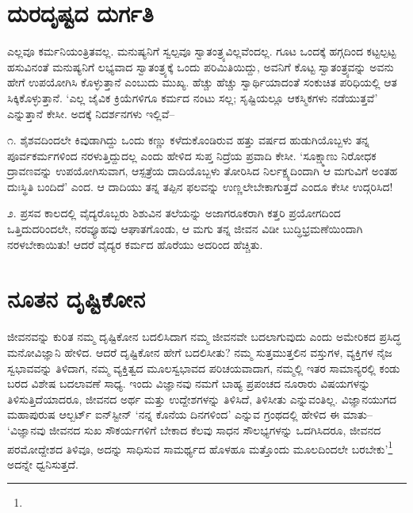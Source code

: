 \section*{ದುರದೃಷ್ಟದ ದುರ್ಗತಿ}


ಎಲ್ಲವೂ ಕರ್ಮನಿಯಂತ್ರಿತವಲ್ಲ. ಮನುಷ್ಯನಿಗೆ ಸ್ವಲ್ಪವೂ ಸ್ವಾತಂತ್ರ್ಯವಿಲ್ಲವೆಂದಲ್ಲ. ಗೂಟ ಒಂದಕ್ಕೆ ಹಗ್ಗದಿಂದ ಕಟ್ಟಲ್ಪಟ್ಟ ಹಸುವಿನಂತೆ ಮನುಷ್ಯನಿಗೆ ಲಭ್ಯವಾದ ಸ್ವಾತಂತ್ರ್ಯಕ್ಕೆ ಒಂದು ಪರಿಮಿತಿಯಿದ್ದು, ಅವನಿಗೆ ಕೊಟ್ಟ ಸ್ವಾತಂತ್ರ್ಯವನ್ನು ಅವನು ಹೇಗೆ ಉಪಯೋಗಿಸಿ ಕೊಳ್ಳುತ್ತಾನೆ ಎಂಬುದು ಮುಖ್ಯ. ಹೆಚ್ಚು ಹೆಚ್ಚು ಸ್ವಾರ್ಥಿಯಾದಂತೆ ಸಂಕುಚಿತ ಪರಿಧಿಯಲ್ಲಿ ಆತ ಸಿಕ್ಕಿಕೊಳ್ಳುತ್ತಾನೆ. ‘ಎಲ್ಲ ಜೈವಿಕ ಕ್ರಿಯೆಗಳಿಗೂ ಕರ್ಮದ ನಂಟು ಸಲ್ಲ; ಸೃಷ್ಟಿಯಲ್ಲೂ ಆಕಸ್ಮಿಕಗಳು ನಡೆಯುತ್ತವೆ’ ಎನ್ನುತ್ತಾನೆ ಕೇಸೀ. ಅದಕ್ಕೆ ನಿದರ್ಶನಗಳು ಇಲ್ಲಿವೆ–

೧. ಶೈಶವದಿಂದಲೇ ಕಿವುಡಾಗಿದ್ದು ಒಂದು ಕಣ್ಣು ಕಳೆದುಕೊಂಡಿರುವ ಹತ್ತು ವರ್ಷದ ಹುಡುಗಿಯೊಬ್ಬಳು ತನ್ನ ಪೂರ್ವಕರ್ಮಗಳಿಂದ ನರಳುತ್ತಿದ್ದುದಲ್ಲ ಎಂದು ಹೇಳಿದ ಸುಪ್ತ ನಿದ್ರೆಯ ಪ್ರವಾದಿ ಕೇಸೀ. ‘ಸೂಕ್ಷ್ಮಾಣು ನಿರೋಧಕ ದ್ರಾವಣವನ್ನು ಉಪಯೋಗಿಸುವಾಗ, ಆಸ್ಪತ್ರೆಯ ದಾದಿಯೊಬ್ಬಳು ತೋರಿಸಿದ ನಿರ್ಲಕ್ಷ್ಯದಿಂದಾಗಿ ಆ ಮಗುವಿಗೆ ಅಂತಹ ದುಃಸ್ಥಿತಿ ಬಂದಿದೆ’ ಎಂದ. ಆ ದಾದಿಯು ತನ್ನ ತಪ್ಪಿನ ಫಲವನ್ನು ಉಣ್ಣಲೇಬೇಕಾಗುತ್ತದೆ ಎಂದೂ ಕೇಸೀ ಉದ್ಗರಿಸಿದ!

೨. ಪ್ರಸವ ಕಾಲದಲ್ಲಿ ವೈದ್ಯರೊಬ್ಬರು ಶಿಶುವಿನ ತಲೆಯನ್ನು ಅಜಾಗರೂಕರಾಗಿ ಕತ್ತರಿ ಪ್ರಯೋಗದಿಂದ ಒತ್ತಿದುದರಿಂದಲೇ, ನರವ್ಯೂಹವು ಆಘಾತಗೊಂಡು, ಆ ಮಗು ತನ್ನ ಜೀವನ ವಿಡೀ ಬುದ್ಧಿಭ್ರಮಣೆಯಿಂದಾಗಿ ನರಳಬೇಕಾಯಿತು! ಆದರೆ ವೈದ್ಯರ ಕರ್ಮದ ಹೊರೆಯು ಅದರಿಂದ ಹೆಚ್ಚಿತು.


\section*{ನೂತನ ದೃಷ್ಟಿಕೋನ}


ಜೀವನವನ್ನು ಕುರಿತ ನಮ್ಮ ದೃಷ್ಟಿಕೋನ ಬದಲಿಸಿದಾಗ ನಮ್ಮ ಜೀವನವೇ ಬದಲಾಗುವುದು ಎಂದು ಅಮೇರಿಕದ ಪ್ರಸಿದ್ಧ ಮನೋವಿಜ್ಞಾನಿ ಹೇಳಿದ. ಆದರೆ ದೃಷ್ಟಿಕೋನ ಹೇಗೆ ಬದಲಿಸೀತು? ನಮ್ಮ ಸುತ್ತಮುತ್ತಲಿನ ವಸ್ತುಗಳ, ವ್ಯಕ್ತಿಗಳ ನೈಜ ಸ್ವಭಾವವನ್ನು ತಿಳಿದಾಗ, ನಮ್ಮ ವ್ಯಕ್ತಿತ್ವದ ಮೂಲಸ್ವಭಾವದ ಪರಿಚಯವಾದಾಗ, ನಮ್ಮಲ್ಲಿ ಇತರ ಸಾಮಾನ್ಯರಲ್ಲಿ ಕಂಡು ಬರದ ವಿಶೇಷ ಬದಲಾವಣೆ ಸಾಧ್ಯ. ಇಂದು ವಿಜ್ಞಾನವು ನಮಗೆ ಬಾಹ್ಯ ಪ್ರಪಂಚದ ನೂರಾರು ವಿಷಯಗಳನ್ನು ತಿಳಿಸುತ್ತಿದೆಯಾದರೂ, ಜೀವನದ ಅರ್ಥ ಮತ್ತು ಉದ್ದೇಶಗಳನ್ನು ತಿಳಿಸಿದೆ, ತಿಳಿಸೀತು ಎನ್ನುವಂತಿಲ್ಲ. ವಿಜ್ಞಾನಯುಗದ ಮಹಾಪುರುಷ ಆಲ್ಬರ್ಟ್ ಐನ್​ಸ್ಟೀನ್ ‘ನನ್ನ ಕೊನೆಯ ದಿನಗಳಿಂದ’ ಎನ್ನುವ ಗ್ರಂಥದಲ್ಲಿ ಹೇಳಿದ ಈ ಮಾತು– ‘ವಿಜ್ಞಾನವು ಜೀವನದ ಸುಖ ಸೌಕರ್ಯಗಳಿಗೆ ಬೇಕಾದ ಕೆಲವು ಸಾಧನ ಸೌಲಭ್ಯಗಳನ್ನು ಒದಗಿಸಿದರೂ, ಜೀವನದ ಪರಮೋದ್ದೇಶದ ತಿಳಿವೂ, ಅದನ್ನು ಸಾಧಿಸುವ ಸಾಮರ್ಥ್ಯದ ಹೊಳಹೂ ಮತ್ತೊಂದು ಮೂಲದಿಂದಲೇ ಬರಬೇಕು’\footnote{} ಅದನ್ನೇ ಧ್ವನಿಸುತ್ತದೆ.

